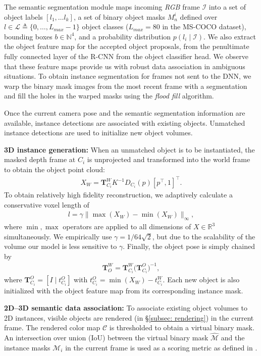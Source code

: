 The semantic segmentation module maps incoming \textit{RGB} frame \(\mathcal{I}\) into a set of object labels $[l_1, \dots l_k]$, a set of binary object masks $M_n^i$ defined over $l \in \mathcal{L} \triangleq \{0, \dots, L_{max}-1\}$ object classes ($L_{max}=80$ in the MS-COCO dataset), bounding boxes $b \in \mathbb{N}^4$, and a probability distribution $p(l_i \mid \mathcal{I})$. We also extract the object feature map for the accepted object proposals, from the penultimate fully connected layer of the R-CNN from the object classifier head. We observe that these feature maps provide us with robust data association in ambiguous situations.
%
To obtain instance segmentation for frames not sent to the DNN, we warp the binary mask images from the most recent frame with a segmentation and fill the holes in the warped masks using the \textit{flood fill} algorithm.

Once the current camera pose and the semantic segmentation information are available, instance detections are associated with existing objects. Unmatched instance detections are used to initialize new object volumes.

\textbf{3D instance generation:} When an unmatched object is to be instantiated, the masked depth frame at $C_i$ is unprojected and transformed into the world frame to obtain the object point cloud:
\begin{align}
X_{W} = \mathbf{T}^W_{C_i} K^{-1} D_{C_i}(p) [p^\top, 1]^\top.
\end{align}
To obtain relatively high fidelity reconstruction, we adaptively calculate a conservative voxel length of
\begin{align}
    l = \gamma \| \max(X_W) - \min(X_W) \|_{\infty},
\end{align}
where $\min, \max$ operators are applied to all dimensions of $X \in \mathbb{R}^3$ simultaneously. We empirically use $\gamma = 1 / 64\sqrt{2}$, but due to the scalability of the volume our model is less sensitive to $\gamma$.
Finally, the object pose is simply chained by
\begin{align}
    \mathbf{T}_{O}^W = \mathbf{T}_{C_i}^{W} \bigg({\mathbf{T}_{C_i}^O}\bigg)^{-1},
\end{align}
where $\mathbf{T}_{C_i}^O = [I \mid t_{C_i}^O]$ with $t_{C_i}^O = \min(X_W) - t_{C_i}^W $. Each new object is also initialized with the object feature map from its corresponding instance mask.

\textbf{2D--3D semantic data association:}
To associate existing object volumes to 2D instances, visible objects are rendered (in \S\ref{subsec: rendering}) in the current frame. The rendered color map $\mathcal{C}$ is thresholded to obtain a virtual binary mask. An intersection over union (IoU) between the virtual binary mask $\hat{\mathcal{M}}$ and the instance masks $\mathcal{M}_i$ in the current frame is used as a scoring metric as defined in \cite{fusionPP}.

